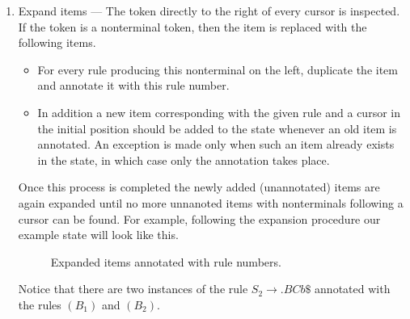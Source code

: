 \documentclass[a4paper,11pt]{article}
\begin{document}
\begin{enumerate}
\item Expand items --- The token directly to the right of every cursor is inspected. 
If the token is a nonterminal token, then the item is replaced with the following items.
\begin{itemize} 
\item For every rule producing this nonterminal on the left, duplicate the item and annotate it with this rule number.
\item In addition a new item corresponding with the given rule and a cursor in the initial position should be added to the state whenever an old item is annotated. 
An exception is made only when such an item already exists in the state, in which case only the annotation takes place.
\end{itemize}
Once this process is completed the newly added (unannotated) items are again expanded until no more unnanoted items with nonterminals following a cursor can be found. 
For example, following the expansion procedure our example state will look like this.

\begin{figure}[!ht]
\centering
{}
\caption{Expanded items annotated with rule numbers.}
\end{figure}

Notice that there are two instances of the rule $S_2 \rightarrow . B C b \$$ annotated with the rules $(B_1)$ and $(B_2)$.


\end{enumerate}
\end{document}
